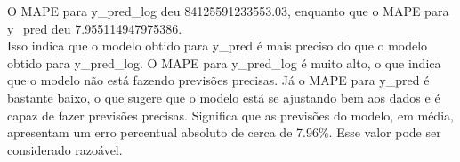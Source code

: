 \documentclass[a4paper, 12pt]{article}
\begin{document}
O MAPE para y\_pred\_log deu 84125591233553.03, enquanto que o MAPE para y\_pred deu 7.955114947975386.\\

Isso indica que o modelo obtido para y\_pred é mais preciso do que o modelo obtido para y\_pred\_log. O MAPE para y\_pred\_log é muito alto, o que indica que o modelo não está fazendo previsões precisas. Já o MAPE para y\_pred é bastante baixo, o que sugere que o modelo está se ajustando bem aos dados e é capaz de fazer previsões precisas.  Significa que as previsões do modelo, em média, apresentam um erro percentual absoluto de cerca de 7.96\%. Esse valor pode ser considerado razoável.




\newpage
\end{document}
